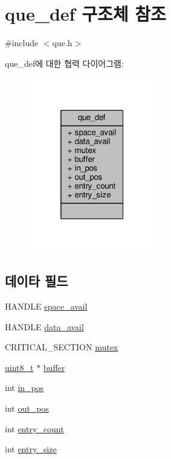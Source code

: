 \hypertarget{structque__def}{}\section{que\+\_\+def 구조체 참조}
\label{structque__def}


{\ttfamily \#include $<$que.\+h$>$}



que\+\_\+def에 대한 협력 다이어그램\+:
\nopagebreak
\begin{figure}[H]
\begin{center}
\leavevmode
\includegraphics[width=157pt]{structque__def__coll__graph}
\end{center}
\end{figure}
\subsection*{데이타 필드}
\begin{DoxyCompactItemize}
\item 
H\+A\+N\+D\+LE \hyperlink{structque__def_a71bec5ae45e00f19c6d6925c9fa4a1be}{space\+\_\+avail}
\item 
H\+A\+N\+D\+LE \hyperlink{structque__def_a94538cc7ead72cb3b5f43d12f42ec148}{data\+\_\+avail}
\item 
C\+R\+I\+T\+I\+C\+A\+L\+\_\+\+S\+E\+C\+T\+I\+ON \hyperlink{structque__def_ab06c895e3ddb3591c4f22c366466d4ca}{mutex}
\item 
\hyperlink{stdint_8h_aba7bc1797add20fe3efdf37ced1182c5}{uint8\+\_\+t} $\ast$ \hyperlink{structque__def_a56ed84df35de10bdb65e72b184309497}{buffer}
\item 
int \hyperlink{structque__def_a8a3e7803079f633c16e621bbdbbbdaf5}{in\+\_\+pos}
\item 
int \hyperlink{structque__def_aa2298e702cfd12ae1cbebcb523196e7c}{out\+\_\+pos}
\item 
int \hyperlink{structque__def_af4144b5c7df947d23550c7c0b8b6afff}{entry\+\_\+count}
\item 
int \hyperlink{structque__def_a85b70ab9a21d34366075fd47dc59f555}{entry\+\_\+size}
\end{DoxyCompactItemize}


